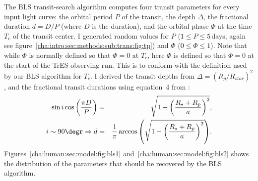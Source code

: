 The BLS transit-search algorithm computes four transit parameters for every input light curve: the orbital period $P$ of the transit, the depth $\Delta$, the fractional duration $d = D/P$ (where $D$ is the duration), and the orbital phase $\Phi$ at the time $T_{c}$ of the transit center.
I generated random values for $P$ ($1\leq P \leq5$\,days; again see figure~\ref{cha:intro:sec:methods:sub:trans:fig:tp}) %
and $\Phi$ ($0\leq \Phi \leq 1$).
Note that while $\Phi$ is normally defined so that $\Phi=0$ at $T_{c}$, here $\Phi$ is defined so that $\Phi=0$ at the start of the TrES observing run.
This is to conform with the definition used by our BLS algorithm for $T_{c}$.
I derived the transit depths from $\Delta = (R_{p}/R_{star})^{2}$, and the fractional transit durations using equation~4 from \citet{Charbonneau_Winn_Latham:apj:2006a}:%
\begin{eqnarray*} \label{cha:human:sec:model:eqn:dur}
\sin{i} \cos{\left(\frac{\pi D}{P}\right)} & = & \sqrt{1 - \left(\frac{R_{\star}+R_{p}}{a}\right)^{2}}, \\%
 i\sim90\degr \Rightarrow d & = & \frac{1}{\pi} \arccos{\left(\sqrt{1 - \left(\frac{R_{\star}+R_{p}}{a}\right)^{2}}\right)}.%
\end{eqnarray*}
Figures~\ref{cha:human:sec:model:fig:bls1} and~\ref{cha:human:sec:model:fig:bls2} shows the distribution of the parameters that should be recovered by the BLS algorithm.
